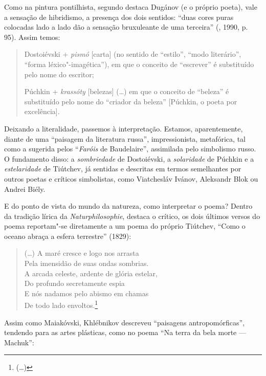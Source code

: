 Como na pintura pontilhista, segundo destaca Dugánov (e o próprio poeta), vale a sensação de hibridismo, a
presença dos dois sentidos: ``duas cores puras colocadas lado a lado dão a
sensação bruxuleante de uma terceira'' (, 1990, p. 95). Assim temos:

\begin{quotation}
Dostoiévski + \emph{pismó} [carta] (no sentido de ``estilo'', ``modo literário'', ``forma
léxico"-imagética''), em que o conceito de ``escrever'' é substituído pelo
nome do escritor;

Púchkin + \emph{krassóty} [belezas] (\ldots{}) em que o conceito de ``beleza'' é substituído
pelo nome do ``criador da beleza'' [Púchkin, o poeta por excelência].
\end{quotation}

Deixando a literalidade, passemos à interpretação.
Estamos, aparentemente, diante de uma ``paisagem da literatura russa'',
impressionista, metafórica, tal como a sugerida pelos ``\emph{Faróis} de
Baudelaire'', assimilada pelo simbolismo russo. O fundamento disso: a
\emph{sombriedade} de Dostoiévski, a \emph{solaridade} de Púchkin e a
\emph{estelaridade} de Tiútchev, já sentidas e descritas
em termos semelhantes por outros poetas e críticos simbolistas, como Viatchesláv
Ivánov, Aleksandr Blok ou Andrei Biély. 

E do ponto de vista do mundo da natureza, como interpretar o poema?
Dentro da tradição lírica da \emph{Naturphilosophie}, destaca o crítico, os dois últimos
versos do poema reportam"-se diretamente a um poema do próprio Tiútchev,
``Como o oceano abraça a esfera terrestre'' (1829):

\begin{verse}
(\ldots{})
A maré cresce e logo nos arrasta \\
Pela imensidão de suas ondas sombrias. \\[8pt]
A arcada celeste, ardente de glória estelar, \\
Do profundo secretamente espia \\
E nós nadamos pelo abismo em chamas \\
De todo lado envoltos.\footnote{(\ldots{}) {}}

\end{verse}

Assim como Maiakóvski, Khlébnikov descreveu ``paisagens
antropomórficas'', tendendo para as artes plásticas, como no poema ``Na
terra da bela morte --- Machuk'':

